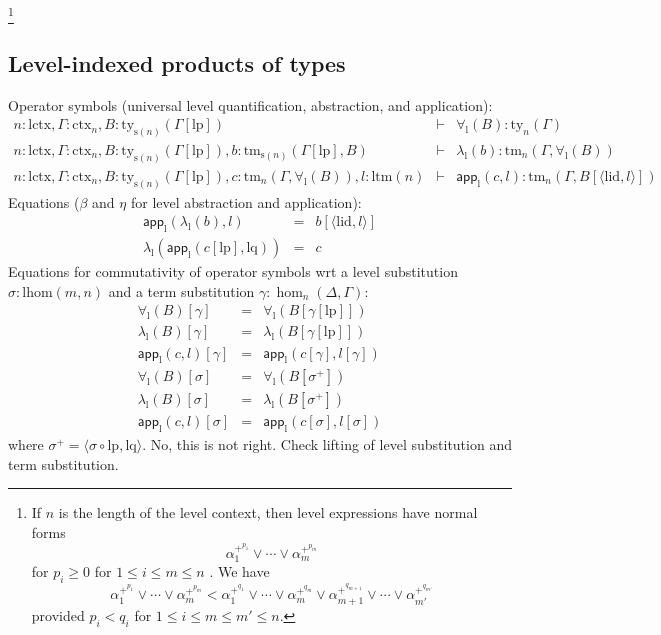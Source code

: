 \documentclass[11pt,a4paper]{article}
\theoremstyle{definition}
\newcommand{\app}[2]{{#1\,#2}} %
\def\lhom{\mathrm{lhom}}
\def\lctx{\mathrm{lctx}}
\def\ltm{\mathrm{ltm}}
\def\lp{\mathrm{lp}}
\def\lq{\mathrm{lq}}
\def\s{\mathrm{s}}
\def\lid{\mathrm{lid}}
\newcommand{\ctx}{\mathrm{ctx}}
\newcommand{\ty}{\mathrm{ty}}
\newcommand{\tm}{\mathrm{tm}}
\newcommand{\tuple}[1]{\langle #1 \rangle}
\def\p{\mathrm{p}}
\def\q{\mathrm{q}}
\def\app{\mathsf{app}}
\begin{document}
\footnote{If  $n$ is the length of the level context, then level expressions have normal forms 
$$
\alpha_1^{+^{p_1}} \vee \cdots \vee \alpha_m^{+^{p_m}}
$$ 
for $p_i \geq 0$ for $1 \le i \le m \le n$ . We have 
$$
\alpha_1^{+^{p_1}} \vee \cdots \vee \alpha_m^{+^{p_m}} 
< 
\alpha_1^{+^{q_1}} \vee \cdots \vee \alpha_m^{+^{q_m}} \vee \alpha_{m+1}^{+^{q_{m+1}}} \vee \cdots \vee \alpha_{m'}  ^{+^{q_{m'}}}
$$ 
provided $p_i < q_i$ for $1 \le i \le m \le m' \le n$.} 

\subsection{Level-indexed products of types}
\def\l{\mathrm{l}}
Operator symbols (universal level quantification, abstraction, and application):
\begin{eqnarray*}
n : \lctx, \Gamma : \ctx_n, B : \ty_{\s(n)}(\Gamma[\lp])&\vdash& \forall_\l(B) : \ty_n(\Gamma)\\
n : \lctx, \Gamma : \ctx_n, B : \ty_{\s(n)}(\Gamma[\lp]), b : \tm_{\s(n)}(\Gamma[\lp], B) &\vdash& \lambda_\l(b) : \tm_n(\Gamma,\forall_\l(B))\\
n : \lctx, \Gamma : \ctx_n, B : \ty_{\s(n)}(\Gamma[\lp]), c :  \tm_n(\Gamma,\forall_\l(B)), l : \ltm(n) &\vdash& \app_\l(c,l) : \tm_n(\Gamma, B[\tuple{\lid,l}])
\end{eqnarray*}
Equations ($\beta$ and $\eta$ for level abstraction and application):
 \begin{eqnarray*}
 \app_\l(\lambda_\l(b),l) &=& b[\tuple{\lid,l}]\\
 \lambda_\l(\app_\l(c[\lp],\lq)) &=& c
 \end{eqnarray*}
 Equations for commutativity of operator symbols wrt a level substitution $\sigma : \lhom(m,n)$ and a term substitution $\gamma : \hom_n(\Delta,\Gamma)$:
 \begin{eqnarray*}
 \forall_\l(B)[ \gamma ] &=& \forall_\l(B[ \gamma[\lp]])\\
 \lambda_\l(B)[ \gamma ] &=& \lambda_\l(B[ \gamma[\lp]])\\
 \app_\l(c,l)[ \gamma ] &=& \app_\l(c[ \gamma ] ,l[ \gamma ] )\\
 \forall_\l(B)[ \sigma ] &=& \forall_\l(B[ \sigma^{+}])\\
 \lambda_\l(B)[ \sigma ] &=& \lambda_\l(B[ \sigma^{+}])\\
\app_\l(c,l)[ \sigma ] &=& \app_\l(c[ \sigma ] ,l[ \sigma ] )
\end{eqnarray*}
where $\sigma^+ = \tuple{\sigma \circ \lp, \lq}$. No, this is not right. Check lifting of level substitution and term substitution.
\end{document}
